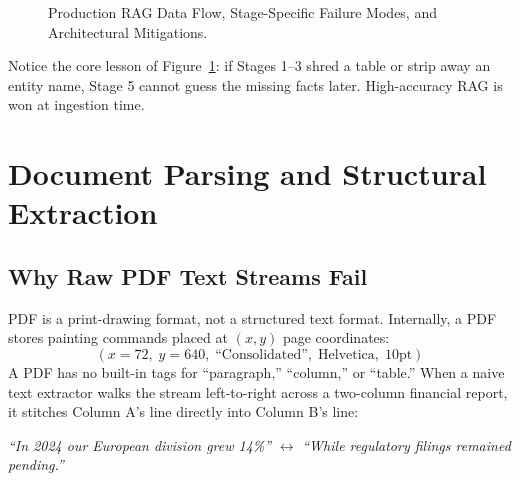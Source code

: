 \begin{figure}[htbp]
\caption{Production RAG Data Flow, Stage-Specific Failure Modes, and Architectural Mitigations.}
\label{fig:v2-ch02-rag-failure-map}
\end{figure}

Notice the core lesson of Figure~\ref{fig:v2-ch02-rag-failure-map}: if Stages 1--3 shred a table or strip away an entity name, Stage 5 cannot guess the missing facts later. High-accuracy RAG is won at ingestion time.

\section{Document Parsing and Structural Extraction}

\subsection{Why Raw PDF Text Streams Fail}
PDF is a print-drawing format, not a structured text format. Internally, a PDF stores painting commands placed at $(x, y)$ page coordinates:
\begin{equation}
(x=72,\; y=640,\; \text{``Consolidated''},\; \text{Helvetica},\; 10\text{pt})
\end{equation}
A PDF has no built-in tags for ``paragraph,'' ``column,'' or ``table.'' When a naive text extractor walks the stream left-to-right across a two-column financial report, it stitches Column A's line directly into Column B's line:
\begin{center}
\emph{``In 2024 our European division grew 14\%''} $\longleftrightarrow$ \emph{``While regulatory filings remained pending.''}
\end{center}


